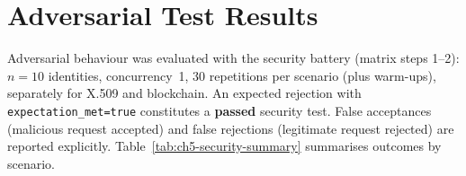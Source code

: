 
\section{Adversarial Test Results}
\label{sec:ch5-adversarial}

Adversarial behaviour was evaluated with the security battery (matrix steps 1--2): $n=10$ identities, concurrency~1, 30 repetitions per scenario (plus warm-ups), separately for X.509 and blockchain. An expected rejection with \texttt{expectation\_met=true} constitutes a \textbf{passed} security test. False acceptances (malicious request accepted) and false rejections (legitimate request rejected) are reported explicitly. Table~\ref{tab:ch5-security-summary} summarises outcomes by scenario.

